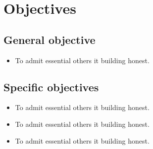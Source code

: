 \section{Objectives}

\subsection{General objective}
\begin{itemize}
    \item To admit essential others it building honest.
\end{itemize}

\subsection{Specific objectives}
\begin{itemize}
    \item To admit essential others it building honest.
    \item To admit essential others it building honest.
    \item To admit essential others it building honest.
\end{itemize}